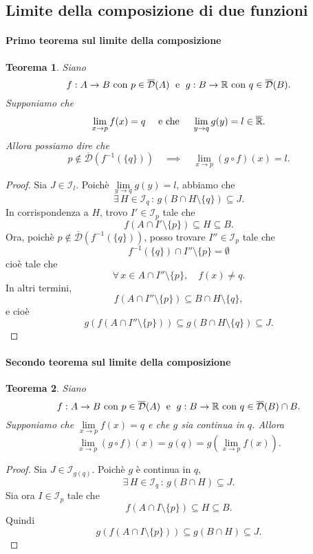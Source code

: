 \documentclass{article}
\theoremstyle{plain}
\newtheorem{thm}{Teorema}[section]
\theoremstyle{definition}
\theoremstyle{remark}
\begin{document}
\vspace{10pt}

\subsection{Limite della composizione di due funzioni}

\vspace{10pt}

\paragraph{Primo teorema sul limite della composizione}
\begin{bxthm}
\begin{thm}
    Siano 
    \[f:A\to B\textup{ con }p\in\overline{\mathcal{D}}(A)\;\textup{ e }\;g:B\to\mathbb{R}\textup{ con }q\in\overline{\mathcal{D}}(B).\]
    Supponiamo che 
    \[\lim_{x\to p}f(x)=q\quad\textup{ e che }\quad\lim_{y\to q}g(y)=l\in\overline{\mathbb{R}}.\]
    Allora possiamo dire che 
    \[p\notin\overline{\mathcal{D}}(f^{-1}(\{q\}))\quad\implies\quad \lim_{x\to p}(g\circ f)(x)=l.\]
\end{thm}
\end{bxthm}
\begin{proof}
    Sia $J\in \mathcal{I}_l$. Poichè $\lim\limits_{y\to q}g(y)=l$, abbiamo che 
    \[\exists\, H\in \mathcal{I}_q\, :\, g(B\cap H\setminus\{q\})\subseteq J.\]
    In corrispondenza a $H$, trovo $I'\in \mathcal{I}_p$ tale che 
    \[f(A\cap I'\setminus\{p\})\subseteq H\subseteq B.\] 
    Ora, poichè $p\notin\overline{\mathcal{D}}(f^{-1}(\{q\}))$, posso trovare $I''\in \mathcal{I}_p$ tale che 
    \[f^{-1}(\{q\})\cap I''\setminus\{p\}=\emptyset\]
    cioè tale che 
    \[\forall\, x\in A\cap I''\setminus\{p\},\quad f(x)\neq q.\]
    In altri termini, \[f(A\cap I''\setminus\{p\})\subseteq B\cap H\setminus\{q\},\]
    e cioè 
    \[g(f(A\cap I''\setminus\{p\}))\subseteq g(B\cap H\setminus\{q\})\subseteq J.\]
\end{proof}

\vspace{10pt}

\paragraph{Secondo teorema sul limite della composizione}
\begin{bxthm}
\begin{thm}
    Siano \[ f:A\to B\textup{ con }p\in\overline{\mathcal{D}}(A)\;\textup{ e }\;g:B\to\mathbb{R}\textup{ con }q\in\overline{\mathcal{D}}(B)\cap B. \]
    Supponiamo che $\lim\limits_{x\to p}f(x)=q$ e che $g$ sia continua in $q$.
    Allora \[\lim_{x\to p}(g\circ f)(x)=g(q)=g(\lim_{x\to p}f(x)).\]
\end{thm}
\end{bxthm}
\begin{proof}
    Sia $J\in \mathcal{I}_{g(q)}$. Poichè $g$ è continua in $q$, 
    \[\exists\, H\in \mathcal{I}_q \,:\, g(B\cap H)\subseteq J.\]
    Sia ora $I\in \mathcal{I}_p$ tale che \[f(A\cap I\setminus\{p\})\subseteq H \subseteq B.\]
    Quindi \[g(f(A\cap I\setminus\{p\}))\subseteq g(B\cap H)\subseteq J.\]
\end{proof}
\end{document}
